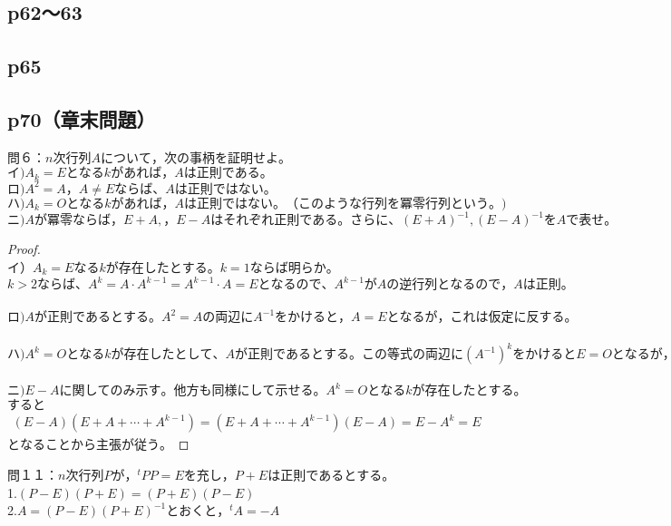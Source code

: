 \documentclass[dvipdfmx,uplatex,11pt]{jsarticle}
\begin{document}
\subsection{p62〜63}
%
%
%
\newpage
%
%
%
\subsection{p65}
%
%
%
\newpage
%
%
%
\subsection{p70（章末問題）}
問６：$n次行列Aについて，次の事柄を証明せよ。$\\
$イ)A_k = E となるkがあれば，Aは正則である。$\\
$ロ)A^2 = A，A\neq Eならば、Aは正則ではない。$\\
$ハ)A_k = Oとなるkがあれば，Aは正則ではない。（このような行列を\textbf{冪零行列}という。)$\\
$ニ)Aが冪零ならば，E+A,，E−Aはそれぞれ正則である。さらに、(E + A)^{−1},(E − A)^{−1}をAで表せ。$
\begin{leftbar}
\begin{proof}
~\\
イ）$A_k=Eなるkが存在したとする。k = 1 ならば明らか。$\\
$k>2ならば、A^k=A·A^{k-1}=A^{k-1}· A = E となるので、A^{k-1}がAの逆行列となるので，Aは正則。$\\
\\
$ロ)Aが正則であるとする。A^2=Aの両辺にA^{-1}をかけると，A=Eとなるが，これは仮定に反する。$\\
\\
$ハ)A^k=Oとなる k が存在したとして、A が正則であるとする。この等式の両辺に (A^{−1})^kをかけるとE=Oとなるが，これは明らかに矛盾。$\\
\\
$ニ)E−A に関してのみ示す。他方も同様にして示せる。A^{k}=Oとなるkが存在したとする。$\\
$すると$
\begin{eqnarray*}
(E − A)(E+A+ \cdots +A^{k−1})=(E+A+ \cdots + A^{k−1})(E−A)=E−A^k=E
\end{eqnarray*}
$となることから主張が従う。$
\end{proof}
\end{leftbar}
%
%
%
\newpage
%
%
%
問１１：$n次行列Pが，^tPP= Eを充し，P+Eは正則であるとする。$\\
1.$ (P − E)(P + E) = (P + E)(P − E)$\\
2.$ A=(P−E)(P+E)^{−1}とおくと，^tA=−A$\\
\end{document}
